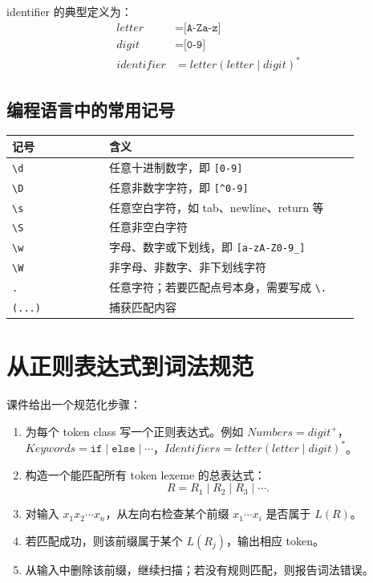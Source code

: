 \documentclass[11pt,a4paper]{article}
\newcommand{\code}[1]{\texttt{#1}}
\begin{document}
identifier 的典型定义为：
\[
\begin{aligned}
letter &= \code{[A-Za-z]}\\
digit &= \code{[0-9]}\\
identifier &= letter(letter \mid digit)^*
\end{aligned}
\]

\subsection{编程语言中的常用记号}

\begin{center}
\begin{tabular}{>{\raggedright\arraybackslash}p{0.24\linewidth} >{\raggedright\arraybackslash}p{0.62\linewidth}}
\toprule
\textbf{记号} & \textbf{含义} \\
\midrule
\code{\textbackslash d} & 任意十进制数字，即 \code{[0-9]} \\
\code{\textbackslash D} & 任意非数字字符，即 \texttt{[\textasciicircum{}0-9]} \\
\code{\textbackslash s} & 任意空白字符，如 tab、newline、return 等 \\
\code{\textbackslash S} & 任意非空白字符 \\
\code{\textbackslash w} & 字母、数字或下划线，即 \code{[a-zA-Z0-9\_]} \\
\code{\textbackslash W} & 非字母、非数字、非下划线字符 \\
\code{.} & 任意字符；若要匹配点号本身，需要写成 \code{\textbackslash .} \\
\code{(...)} & 捕获匹配内容 \\
\bottomrule
\end{tabular}
\end{center}

\section{从正则表达式到词法规范}

课件给出一个规范化步骤：

\begin{enumerate}
  \item 为每个 token class 写一个正则表达式。例如 $Numbers=digit^+$，$Keywords=\code{if}\mid\code{else}\mid\cdots$，$Identifiers=letter(letter\mid digit)^*$。
  \item 构造一个能匹配所有 token lexeme 的总表达式：
  \[
  R = R_1 \mid R_2 \mid R_3 \mid \cdots.
  \]
  \item 对输入 $x_1x_2\cdots x_n$，从左向右检查某个前缀 $x_1\cdots x_i$ 是否属于 $L(R)$。
  \item 若匹配成功，则该前缀属于某个 $L(R_j)$，输出相应 token。
  \item 从输入中删除该前缀，继续扫描；若没有规则匹配，则报告词法错误。
\end{enumerate}
\end{document}
